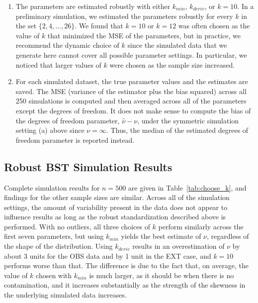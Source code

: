 \documentclass[12pt]{article}
\begin{document}
\begin{doublespacing}
\begin{enumerate}
\item The parameters are estimated robustly with either $k_{min}$, $k_{deriv}$, or $k=10$.  In a preliminary simulation, we estimated the parameters robustly for every $k$ in the set $\{2,4,\ldots, 26\}$. We found that $k=10$ or $k=12$ was often chosen as the value of $k$ that minimized the MSE of the parameters, but in practice, we recommend the dynamic choice of $k$ since the simulated data that we generate here cannot cover all possible parameter settings.  In particular, we noticed that larger values of $k$ were chosen as the sample size increased.

\item For each simulated dataset, the true parameter values and the estimates are saved.  The  MSE (variance of the estimator plus the bias squared) across all 250 simulations is computed and then averaged across all of the parameters except the degrees of freedom.  It does not make sense to compute the bias of the degrees of freedom parameter, $\hat\nu-\nu$,  under the symmetric simulation setting (a) above since $\nu=\infty$.  Thus, the median of the estimated degrees of freedom parameter is reported instead.




\end{enumerate}





\subsection{Robust BST  Simulation Results}

Complete simulation results for $n=500$ are given in Table~\ref{tab:choose_k}, and findings for the other sample sizes are similar.  Across all of the simulation settings, the amount of variability present in the data does not appear to influence  results as long as the robust standardization described above is performed.  With no outliers,   all three choices of $k$ perform similarly across the first seven parameters, but using $k_{min}$ yields the best estimate of $\nu$, regardless of the shape of the distribution.  Using $k_{deriv}$ results in an overestimation of $\nu$ by about 3 units for the OBS data and by 1 unit in the EXT case, and $k=10$ performs worse than that.  The difference is due to the fact that, on average, the value of $k$ chosen with $k_{min}$ is much larger, as it should be when there is  no contamination, and it increases substantially as the strength of the skewness in the underlying simulated data increases.  


\end{doublespacing}
\end{document}
